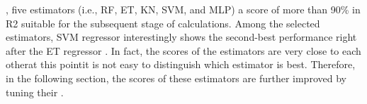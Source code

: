     \DIFdelbegin {}\DIFdelend \DIFaddbegin {}\DIFaddend , five estimators (i.e., \gls{RF}, \gls{ET}, \gls{KN}, \DIFdelbegin %
\DIFdelend \DIFaddbegin \gls{SVM}\DIFaddend , and \gls{MLP}) \DIFdelbegin {}\DIFdelend \DIFaddbegin {}\DIFaddend a score of more than 90\% in \DIFdelbegin {}\DIFdelend \DIFaddbegin \gls{R2} \DIFaddend suitable for the subsequent stage of \DIFdelbegin {}\DIFdelend calculations. Among the selected estimators, \DIFdelbegin {}%
\DIFdelend \DIFaddbegin {}\gls{SVM} \DIFaddend regressor interestingly shows the second-best performance right after the \gls{ET} regressor \DIFaddbegin {}\DIFaddend . In fact, \DIFdelbegin {}\DIFdelend \DIFaddbegin {}\DIFaddend the scores of the \DIFdelbegin {}\DIFdelend \DIFaddbegin {}\DIFaddend estimators are very close to each other\DIFdelbegin {}\DIFdelend \DIFaddbegin \DIFadd{, }\DIFaddend at this point\DIFaddbegin \DIFadd{, }\DIFaddend it is not easy to distinguish which estimator is \DIFaddbegin {}\DIFaddend best. Therefore, in the following section, the \DIFaddbegin {}\DIFaddend scores of these \DIFdelbegin {}\DIFdelend estimators are further improved by tuning their \DIFdelbegin {}\DIFdelend \DIFaddbegin {}\DIFaddend .

